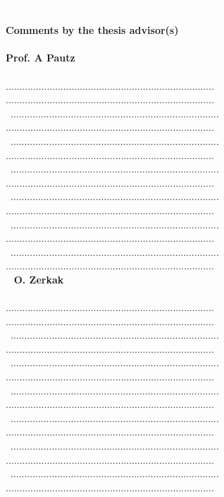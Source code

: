 \documentclass[11pt,titlepage]{article}
\begin{document}
\newpage
\textcolor{white}.\\\\
\noindent \textbf{Comments by the thesis advisor(s)}\\\\
\noindent\textbf{Prof. A Pautz}\\\\
............................................................................
............................................................................\\\
............................................................................
............................................................................\\\
............................................................................
............................................................................\\\
............................................................................
............................................................................\\\
............................................................................
............................................................................\\\
............................................................................
............................................................................\\\
............................................................................
............................................................................\\\
%
\noindent\textbf{O. Zerkak}\\\\
............................................................................
............................................................................\\\
............................................................................
............................................................................\\\
............................................................................
............................................................................\\\
............................................................................
............................................................................\\\
............................................................................
............................................................................\\\
............................................................................
............................................................................\\\
............................................................................
............................................................................\\\
\end{document}
